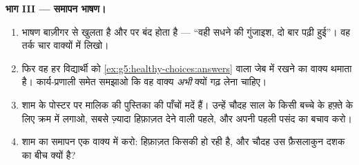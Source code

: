 \begin{problem}[{सप्ताहांत समस्या --- स्कूल की अभिभावक-और-विद्यार्थी
शाम, कार्य-प्रणालियों के साथ लिखी
हुई}]
\medskip\noindent\textbf{भाग III --- समापन भाषण।}
\begin{enumerate}[resume]
  \item भाषण बाज़ीगर से खुलता है और  पर बंद होता है --- ``वही सधने
        की गुंजाइश, दो बार पढ़ी हुई''। वह तर्क चार वाक्यों में लिखो।
  \item फिर वह हर विद्यार्थी को \cref{ex:g5:healthy-choices:answers}
        वाला जेब में रखने का वाक्य थमाता है। कार्य-प्रणाली समेत
        समझाओ कि वह वाक्य \emph{अभी} क्यों गढ़ लेना चाहिए।
  \item शाम के पोस्टर पर मालिक की पुस्तिका की पाँचों मदें हैं।
        उन्हें चौदह साल के किसी बच्चे के हफ़्ते के लिए क्रम में लगाओ,
        सबसे ज़्यादा हिफ़ाज़त देने वाली पहले, और अपनी पहली पसंद का
        बचाव करो।
  \item शाम का समापन एक वाक्य में करो: हिफ़ाज़त किसकी हो रही है, और
        चौदह उस फ़ैसलाकुन दशक का बीच क्यों है?
\end{enumerate}
\end{problem}
